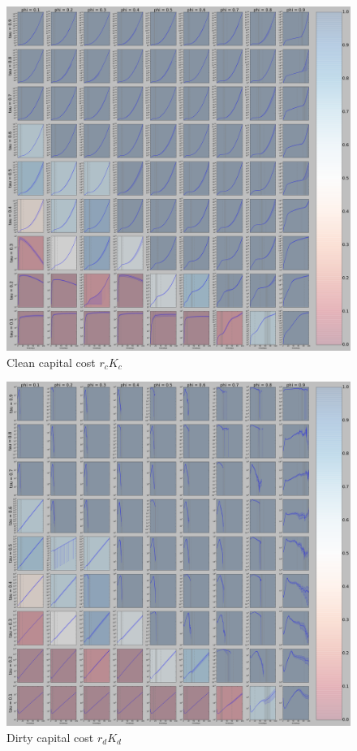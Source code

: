 \begin{figure}[H]
	\centering
	\includegraphics[width = \linewidth]{figures/K_c_cost'b_r'=1o0.pdf}
	\caption{Clean capital cost $r_c K_c$}
	\label{K_c_cost}
\end{figure}

\begin{figure}[H]
	\centering
	\includegraphics[width = \linewidth]{figures/K_d_cost'b_r'=1o0.pdf}
	\caption{Dirty capital cost $r_d K_d$}
	\label{K_d_cost}
\end{figure}
{}
    
